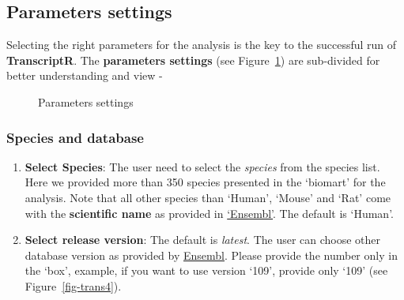 \documentclass[
  a4paper,
  DIV=11,
  numbers=noendperiod,
  oneside,
  open=any]{scrreport}
\providecommand{\tightlist}{%
  \setlength{\itemsep}{0pt}\setlength{\parskip}{0pt}}\usepackage{longtable,booktabs,array}
\begin{document}
\subsection{Parameters settings}\label{parameters-settings}

Selecting the right parameters for the analysis is the key to the
successful run of \textbf{TranscriptR}. The \textbf{parameters settings}
(see Figure~\ref{fig-trans3}) are sub-divided for better understanding
and view -

\begin{figure}[H]


\caption{\label{fig-trans3}Parameters settings}

\end{figure}%

\subsubsection{Species and database}\label{species-and-database}

\begin{enumerate}
\def\labelenumi{\arabic{enumi}.}
\tightlist
\item
  \textbf{Select Species}: The user need to select the \emph{species}
  from the species list. Here we provided more than 350 species
  presented in the `biomart' for the analysis. Note that all other
  species than `Human', `Mouse' and `Rat' come with the
  \textbf{scientific name} as provided in
  \href{http://www.ensembl.org/info/about/species.html}{`Ensembl'}. The
  default is `Human'.
\item
  \textbf{Select release version}: The default is \emph{latest}. The
  user can choose other database version as provided by
  \href{https://ftp.ensembl.org/pub/}{Ensembl}. Please provide the
  number only in the `box', example, if you want to use version `109',
  provide only `109' (see Figure~\ref{fig-trans4}).
\end{enumerate}
\end{document}
